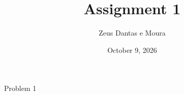 \documentclass{scrreport}
\title{Assignment 1}
\author{Zeus Dantas e Moura}
\date{October 9, 2026}
\begin{document}
\maketitle

\begin{problem}{Problem 1}
\end{problem}

\begin{solution}
\end{solution}
\end{document}
